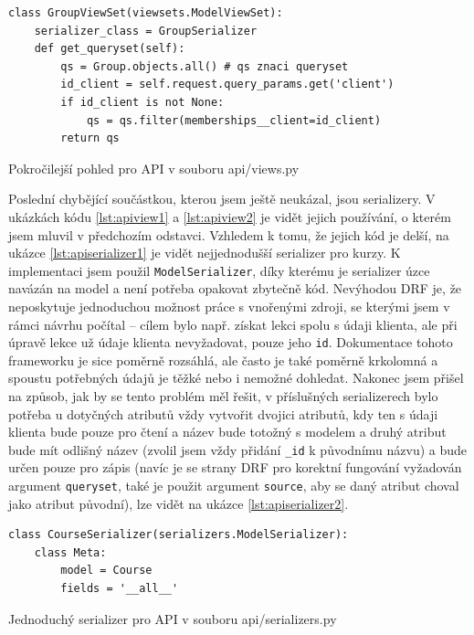     \begin{listing}[ht]
    	\begin{verbatim}
class GroupViewSet(viewsets.ModelViewSet):
    serializer_class = GroupSerializer
    def get_queryset(self):
        qs = Group.objects.all() # qs znaci queryset
        id_client = self.request.query_params.get('client')
        if id_client is not None:
            qs = qs.filter(memberships__client=id_client)
        return qs
    	\end{verbatim}
    	\caption{Pokročilejší pohled pro API v souboru api/views.py}\label{lst:apiview2}
    \end{listing}
    
    Poslední chybějící součástkou, kterou jsem ještě neukázal, jsou serializery. V ukázkách kódu \ref{lst:apiview1} a \ref{lst:apiview2} je vidět jejich používání, o kterém jsem mluvil v předchozím odstavci. Vzhledem k tomu, že jejich kód je delší, na ukázce \ref{lst:apiserializer1} je vidět nejjednodušší serializer pro kurzy. K implementaci jsem použil \verb|ModelSerializer|, díky kterému je serializer úzce navázán na model a není potřeba opakovat zbytečně kód. Nevýhodou DRF je, že neposkytuje jednoduchou možnost práce s vnořenými zdroji, se kterými jsem v rámci návrhu počítal -- cílem bylo např. získat lekci spolu s údaji klienta, ale při úpravě lekce už údaje klienta nevyžadovat, pouze jeho \verb|id|. Dokumentace tohoto frameworku je sice poměrně rozsáhlá, ale často je také poměrně krkolomná a spoustu potřebných údajů je těžké nebo i nemožné dohledat. Nakonec jsem přišel na způsob, jak by se tento problém měl řešit, v příslušných serializerech bylo potřeba u dotyčných atributů vždy vytvořit dvojici atributů, kdy ten s údaji klienta bude pouze pro čtení a název bude totožný s modelem a druhý atribut bude mít odlišný název (zvolil jsem vždy přidání \verb|_id| k původnímu názvu) a bude určen pouze pro zápis (navíc je se strany DRF pro korektní fungování vyžadován argument \verb|queryset|, také je použit argument \verb|source|, aby se daný atribut choval jako atribut původní), lze vidět na ukázce \ref{lst:apiserializer2}. 
    
    \begin{listing}[ht]
    	\begin{verbatim}
class CourseSerializer(serializers.ModelSerializer):
    class Meta:
        model = Course
        fields = '__all__'
    	\end{verbatim}
    	\caption{Jednoduchý serializer pro API v souboru api/serializers.py}\label{lst:apiserializer1}
    \end{listing}
    
